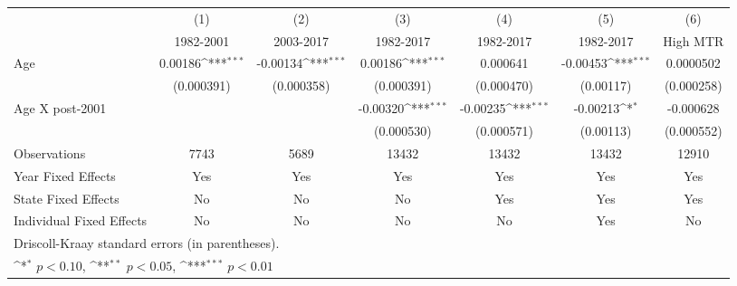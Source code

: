 {
\def\sym#1{\ifmmode^{#1}\else\(^{#1}\)\fi}
\begin{tabular}{l*{6}{c}}
\hline\hline
                &\multicolumn{1}{c}{(1)}&\multicolumn{1}{c}{(2)}&\multicolumn{1}{c}{(3)}&\multicolumn{1}{c}{(4)}&\multicolumn{1}{c}{(5)}&\multicolumn{1}{c}{(6)}\\
                &\multicolumn{1}{c}{1982-2001}&\multicolumn{1}{c}{2003-2017}&\multicolumn{1}{c}{1982-2017}&\multicolumn{1}{c}{1982-2017}&\multicolumn{1}{c}{1982-2017}&\multicolumn{1}{c}{High MTR}\\
\hline
Age             &  0.00186\sym{***}& -0.00134\sym{***}&  0.00186\sym{***}& 0.000641         & -0.00453\sym{***}&0.0000502         \\
                &(0.000391)         &(0.000358)         &(0.000391)         &(0.000470)         &(0.00117)         &(0.000258)         \\
[1em]
Age X post-2001 &                  &                  & -0.00320\sym{***}& -0.00235\sym{***}& -0.00213\sym{*}  &-0.000628         \\
                &                  &                  &(0.000530)         &(0.000571)         &(0.00113)         &(0.000552)         \\
\hline
Observations    &     7743         &     5689         &    13432         &    13432         &    13432         &    12910         \\
Year Fixed Effects          &      Yes         &      Yes         &      Yes         &      Yes         &      Yes         &      Yes         \\
State Fixed Effects         &       No         &       No         &       No         &      Yes         &      Yes         &      Yes         \\
Individual Fixed Effects         &       No         &       No         &       No         &       No         &      Yes         &       No         \\
\hline \hline
\multicolumn{5}{l}{\footnotesize Driscoll-Kraay standard errors (in parentheses).} \\
\multicolumn{5}{l}{\footnotesize \sym{*} \(p<0.10\), \sym{**} \(p<0.05\), \sym{***} \(p<0.01\)}  \end{tabular} }
